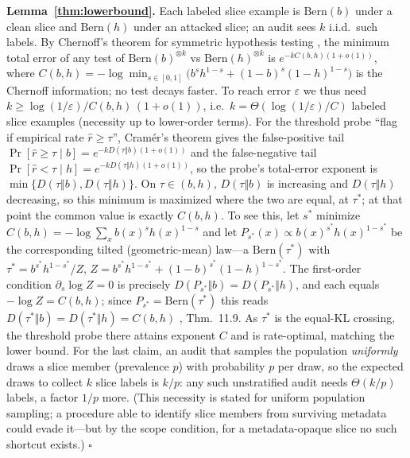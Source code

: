 \documentclass[conference]{IEEEtran}
\begin{document}
\medskip
\noindent\textbf{Lemma~\ref{thm:lowerbound}.} Each labeled slice example is $\mathrm{Bern}(b)$ under a clean
slice and $\mathrm{Bern}(h)$ under an attacked slice; an audit sees $k$ i.i.d.\ such labels. By Chernoff's
theorem for symmetric hypothesis testing \cite{chernoff1952,cover2006}, the minimum total
error of any test of $\mathrm{Bern}(b)^{\otimes k}$ vs $\mathrm{Bern}(h)^{\otimes k}$ is $e^{-kC(b,h)(1+o(1))}$,
where $C(b,h)=-\log\min_{s\in[0,1]}\big(b^s h^{1-s}+(1-b)^s(1-h)^{1-s}\big)$ is the Chernoff information; no test
decays faster. To reach error $\varepsilon$ we thus need
$k\ge \log(1/\varepsilon)/C(b,h)\,(1+o(1))$, i.e.\ $k=\Theta(\log(1/\varepsilon)/C)$ labeled slice examples (necessity up to
lower-order terms). For the threshold probe ``flag if empirical rate $\widehat r\ge\tau$'', Cram\'er's theorem
gives the false-positive tail $\Pr[\widehat r\ge\tau\mid b]=e^{-kD(\tau\Vert b)(1+o(1))}$ and the false-negative
tail $\Pr[\widehat r<\tau\mid h]=e^{-kD(\tau\Vert h)(1+o(1))}$, so the probe's total-error exponent is
$\min\{D(\tau\Vert b),D(\tau\Vert h)\}$. On $\tau\in(b,h)$, $D(\tau\Vert b)$ is increasing and $D(\tau\Vert h)$
decreasing, so this minimum is maximized where the two are equal, at $\tau^\ast$; at that point the common value
is exactly $C(b,h)$. To see this, let $s^\ast$ minimize $C(b,h)=-\log\sum_x b(x)^s h(x)^{1-s}$ and let
$P_{s^\ast}(x)\propto b(x)^{s^\ast}h(x)^{1-s^\ast}$ be the corresponding tilted (geometric-mean) law---a
$\mathrm{Bern}(\tau^\ast)$ with $\tau^\ast=b^{s^\ast}h^{1-s^\ast}/Z$, $Z=b^{s^\ast}h^{1-s^\ast}+(1-b)^{s^\ast}
(1-h)^{1-s^\ast}$. The first-order condition $\partial_s\log Z=0$ is precisely $D(P_{s^\ast}\Vert b)=
D(P_{s^\ast}\Vert h)$, and each equals $-\log Z=C(b,h)$; since $P_{s^\ast}=\mathrm{Bern}(\tau^\ast)$ this reads
$D(\tau^\ast\Vert b)=D(\tau^\ast\Vert h)=C(b,h)$ \cite{cover2006}, Thm.~11.9. As $\tau^\ast$ is the
equal-KL crossing, the threshold probe there attains exponent $C$ and is rate-optimal, matching the lower bound. For the last
claim, an audit that samples the population \emph{uniformly} draws a slice member (prevalence $p$) with
probability $p$ per draw, so the expected draws to collect $k$ slice labels is $k/p$: any such unstratified
audit needs $\Theta(k/p)$ labels, a factor $1/p$ more. (This necessity is stated for uniform population
sampling; a procedure able to identify slice members from surviving metadata could evade it---but by the scope
condition, for a metadata-opaque slice no such shortcut exists.) \hfill$\square$
\end{document}
